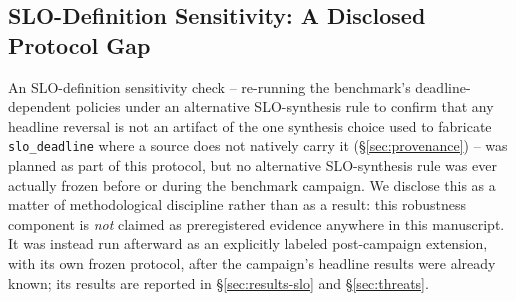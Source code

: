 \subsection{SLO-Definition Sensitivity: A Disclosed Protocol Gap}
\label{sec:slo-sensitivity-gap}

An SLO-definition sensitivity check -- re-running the benchmark's
deadline-dependent policies under an alternative SLO-synthesis rule to
confirm that any headline reversal is not an artifact of the one
synthesis choice used to fabricate \texttt{slo\_deadline} where a source
does not natively carry it (\S\ref{sec:provenance}) -- was planned as part
of this protocol, but no alternative SLO-synthesis rule was ever actually
frozen before or during the benchmark campaign. We disclose this as a matter
of methodological discipline rather than as a result: this robustness
component is \emph{not} claimed as preregistered evidence anywhere in
this manuscript. It was instead run afterward as an explicitly labeled
post-campaign extension, with its own frozen protocol, after
the campaign's headline results were already known; its results are reported
in \S\ref{sec:results-slo} and \S\ref{sec:threats}.
